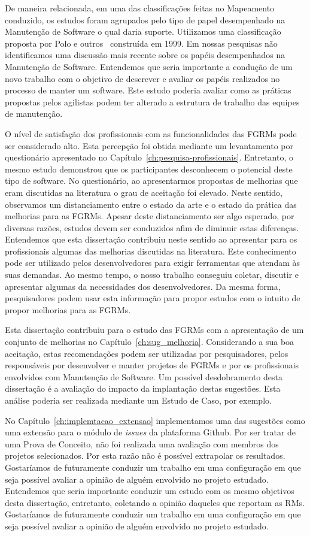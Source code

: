 De maneira relacionada, em uma das classificações feitas no Mapeamento
conduzido, os estudos foram agrupados pelo tipo de papel desempenhado na
Manutenção de Software o qual daria suporte. Utilizamos uma classificação
proposta por Polo e outros~\cite{Polo1999} construída em 1999. Em nossas
pesquisas não identificamos uma discussão mais recente sobre os papéis
desempenhados na Manutenção de Software. Entendemos que seria importante a
condução de um novo trabalho com o objetivo de descrever e avaliar os papéis
realizados no processo de manter um software. Este estudo poderia avaliar como
as práticas propostas pelos agilistas podem ter alterado a estrutura de trabalho
das equipes de manutenção.

O nível de satisfação dos profissionais com as funcionalidades das FGRMs pode
ser considerado alto. Esta percepção foi obtida mediante um levantamento por
questionário apresentado no Capítulo~\ref{ch:pesquisa-profissionais}.
Entretanto, o mesmo estudo demonstrou que os participantes desconhecem o
potencial deste tipo de software. No questionário, ao apresentarmos propostas de
melhorias que eram discutidas na literatura o grau de aceitação foi elevado.
Neste sentido, observamos um distanciamento entre o estado da arte e o estado da
prática das melhorias para as FGRMs. Apesar deste distanciamento ser algo
esperado, por diversas razões, estudos devem ser conduzidos afim de diminuir
estas diferenças. Entendemos que esta dissertação contribuiu neste sentido ao
apresentar para os profissionais algumas das melhorias discutidas na literatura.
Este conhecimento pode ser utilizado pelos desenvolvedores para exigir
ferramentas que atendam às suas demandas. Ao mesmo tempo, o nosso trabalho
conseguiu coletar, discutir e apresentar algumas da necessidades dos
desenvolvedores. Da mesma forma, pesquisadores podem usar esta informação para
propor estudos com o intuito de propor melhorias para as FGRMs.

Esta dissertação contribuiu para o estudo das FGRMs com a apresentação de um
conjunto de melhorias no Capítulo~\ref{ch:sug_melhoria}. Considerando a sua boa
aceitação, estas recomendações podem ser utilizadas por pesquisadores, pelos
responsáveis por desenvolver e manter projetos de FGRMs e por os profissionais
envolvidos com Manutenção de Software. Um possível desdobramento desta
dissertação é a avaliação do impacto da implantação destas sugestões. Esta
análise poderia ser realizada mediante um Estudo de Caso, por exemplo.

No Capítulo~\ref{ch:implemtacao_extensao} implementamos uma das sugestões como
uma extensão para o módulo de \textit{issues} da plataforma Github. Por ser
tratar de uma Prova de Conceito, não foi realizada uma avaliação com membros dos
projetos selecionados. Por esta razão não é possível extrapolar os resultados.
Gostaríamos de futuramente conduzir um trabalho em uma configuração em que seja
possível avaliar a opinião de alguém envolvido no projeto estudado. Entendemos
que seria importante conduzir um estudo com os mesmo objetivos desta
dissertação, entretanto, coletando a opinião daqueles que reportam as RMs.
Gostaríamos de futuramente conduzir um trabalho em uma configuração em que seja
possível avaliar a opinião de alguém envolvido no projeto estudado.

